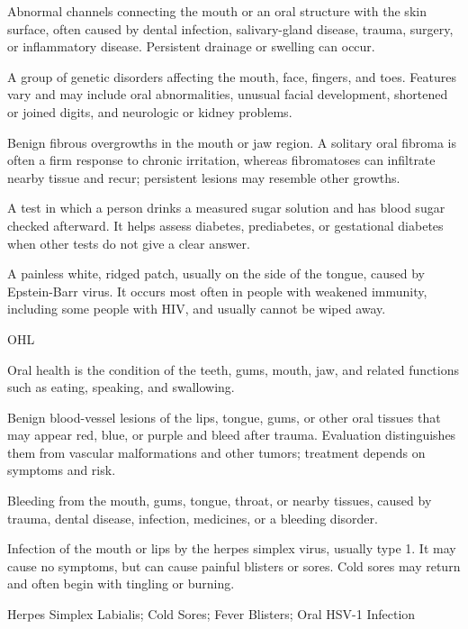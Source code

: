  Abnormal channels connecting the mouth or an oral structure with the skin surface, often caused by dental infection, salivary-gland disease, trauma, surgery, or inflammatory disease. Persistent drainage or swelling can occur.

 A group of genetic disorders affecting the mouth, face, fingers, and toes. Features vary and may include oral abnormalities, unusual facial development, shortened or joined digits, and neurologic or kidney problems.

 Benign fibrous overgrowths in the mouth or jaw region. A solitary oral fibroma is often a firm response to chronic irritation, whereas fibromatoses can infiltrate nearby tissue and recur; persistent lesions may resemble other growths.

 A test in which a person drinks a measured sugar solution and has blood sugar checked afterward. It helps assess diabetes, prediabetes, or gestational diabetes when other tests do not give a clear answer.

 A painless white, ridged patch, usually on the side of the tongue, caused by Epstein-Barr virus. It occurs most often in people with weakened immunity, including some people with HIV, and usually cannot be wiped away.

\synonyms
OHL

 Oral health is the condition of the teeth, gums, mouth, jaw, and related functions such as eating, speaking, and swallowing.

 Benign blood-vessel lesions of the lips, tongue, gums, or other oral tissues that may appear red, blue, or purple and bleed after trauma. Evaluation distinguishes them from vascular malformations and other tumors; treatment depends on symptoms and risk.

 Bleeding from the mouth, gums, tongue, throat, or nearby tissues, caused by trauma, dental disease, infection, medicines, or a bleeding disorder.

 Infection of the mouth or lips by the herpes simplex virus, usually type 1. It may cause no symptoms, but can cause painful blisters or sores. Cold sores may return and often begin with tingling or burning.

\synonyms
Herpes Simplex Labialis; Cold Sores; Fever Blisters; Oral HSV-1 Infection

